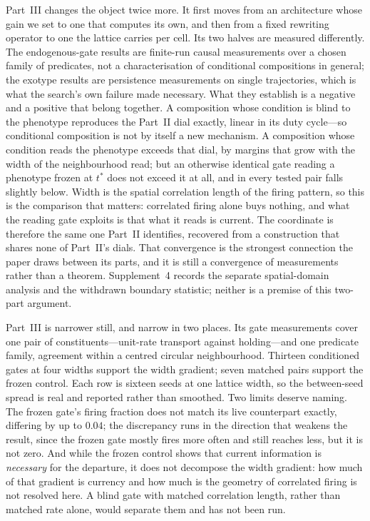 \documentclass[man,12pt,floatsintext,donotrepeattitle]{apa7}
\begin{document}
Part~III changes the object twice more. It first moves from an architecture whose gain we
set to one that computes its own, and then from a fixed rewriting operator to one the
lattice carries per cell. Its two halves are measured differently. The endogenous-gate results are
finite-run causal measurements over a chosen family of predicates, not a
characterisation of conditional compositions in general; the exotype results are
persistence measurements on single trajectories, which is what the search's own failure
made necessary. What
they establish is a negative and a positive that belong together. A composition
whose condition is blind to the phenotype reproduces the Part~II dial exactly,
linear in its duty cycle---so conditional composition is not by itself a new
mechanism. A composition whose condition reads the phenotype exceeds that dial,
by margins that grow with the width of the neighbourhood read; but an otherwise
identical gate reading a phenotype frozen at $t^{*}$ does not exceed it at all,
and in every tested pair falls slightly below. Width is the spatial correlation
length of the firing pattern, so this is the comparison that matters: correlated
firing alone buys nothing, and what the reading gate exploits is that what it
reads is current. The coordinate is therefore the same one Part~II identifies,
recovered from a construction that shares none of Part~II's dials. That
convergence is the strongest connection the paper draws between its parts, and it
is still a convergence of measurements rather than a theorem. Supplement~4 records the separate spatial-domain
analysis and the withdrawn boundary statistic; neither is a premise of this
two-part argument.

Part~III is narrower still, and narrow in two places. Its gate measurements cover one pair
of constituents---unit-rate transport against holding---and one predicate family, agreement
within a centred circular neighbourhood. Thirteen conditioned gates at four widths support the width
gradient; seven matched pairs support the frozen control. Each row is sixteen seeds at
one lattice width, so the between-seed spread is real and reported rather than
smoothed. Two limits deserve naming. The frozen gate's firing fraction does not match
its live counterpart exactly, differing by up to $0.04$; the discrepancy runs in the
direction that weakens the result, since the frozen gate mostly fires more often and
still reaches less, but it is not zero. And while the frozen control shows that current
information is \emph{necessary} for the departure, it does not decompose the width
gradient: how much of that gradient is currency and how much is the geometry of
correlated firing is not resolved here. A blind gate with matched correlation length,
rather than matched rate alone, would separate them and has not been run.
\end{document}
